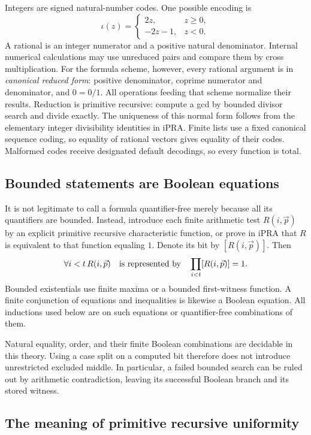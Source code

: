 Integers are signed natural-number codes. One possible encoding is
\[
 \iota(z)=
 \begin{cases}2z,&z\geq0,\\-2z-1,&z<0.\end{cases}
\]
A rational is an integer numerator and a positive natural denominator.
Internal numerical calculations may use unreduced pairs and compare
them by cross multiplication. For the formula scheme, however, every
rational argument is in \emph{canonical reduced form}: positive
denominator, coprime numerator and denominator, and \(0=0/1\).
All operations feeding that scheme normalize their results.
Reduction is primitive recursive: compute a gcd by bounded divisor
search and divide exactly. The uniqueness of this normal form follows
from the elementary integer divisibility identities in iPRA.
Finite lists use a fixed canonical sequence coding, so equality of
rational vectors gives equality of their codes.
Malformed codes receive designated default decodings, so every function
is total.

\subsection{Bounded statements are Boolean equations}

It is not legitimate to call a formula quantifier-free merely because
all its quantifiers are bounded. Instead, introduce each finite
arithmetic test \(R(i,\vec p)\) by an explicit primitive recursive
characteristic function, or prove in iPRA that \(R\) is equivalent
to that function equaling \(1\). Denote its bit by \([R(i,\vec p)]\).
Then
\[
 \forall i<t\,R(i,\vec p)
 \quad\hbox{is represented by}\quad
 \prod_{i<t}[R(i,\vec p)]=1.
\]
Bounded existentials use finite maxima or a bounded first-witness
function. A finite conjunction of equations and inequalities is likewise
a Boolean equation. All inductions used below are on such equations or
quantifier-free combinations of them.

Natural equality, order, and their finite Boolean combinations are
decidable in this theory. Using a case split on a computed bit therefore
does not introduce unrestricted excluded middle. In particular, a
failed bounded search can be ruled out by arithmetic contradiction,
leaving its successful Boolean branch and its stored witness.

\subsection{The meaning of primitive recursive uniformity}

